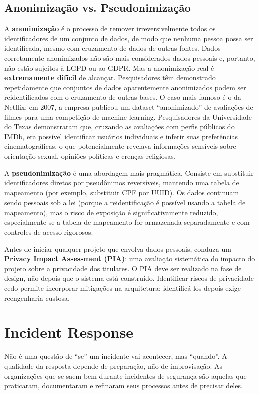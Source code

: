 \subsection{Anonimização vs. Pseudonimização}

A \textbf{anonimização} é o processo de remover irreversivelmente todos os
identificadores de um conjunto de dados, de modo que nenhuma pessoa possa ser
identificada, mesmo com cruzamento de dados de outras fontes. Dados
corretamente anonimizados não são mais considerados dados pessoais e, portanto,
não estão sujeitos à LGPD ou ao GDPR. Mas a anonimização real é
\textbf{extremamente difícil} de alcançar. Pesquisadores têm demonstrado
repetidamente que conjuntos de dados aparentemente anonimizados podem ser
reidentificados com o cruzamento de outras bases. O caso mais famoso é o da
Netflix: em 2007, a empresa publicou um dataset ``anonimizado'' de avaliações
de filmes para uma competição de machine learning. Pesquisadores da Universidade
do Texas demonstraram que, cruzando as avaliações com perfis públicos do IMDb,
era possível identificar usuários individuais e inferir suas preferências
cinematográficas, o que potencialmente revelava informações sensíveis sobre
orientação sexual, opiniões políticas e crenças religiosas.

A \textbf{pseudonimização} é uma abordagem mais pragmática. Consiste em
substituir identificadores diretos por pseudônimos reversíveis, mantendo uma
tabela de mapeamento (por exemplo, substituir CPF por UUID). Os dados continuam
sendo pessoais sob a lei (porque a reidentificação é possível usando a tabela de
mapeamento), mas o risco de exposição é significativamente reduzido, especialmente
se a tabela de mapeamento for armazenada separadamente e com controles de acesso
rigorosos.

Antes de iniciar qualquer projeto que envolva dados pessoais, conduza um
\textbf{Privacy Impact Assessment (PIA)}: uma avaliação sistemática do impacto
do projeto sobre a privacidade dos titulares. O PIA deve ser realizado na fase
de design, não depois que o sistema está construído. Identificar riscos de
privacidade cedo permite incorporar mitigações na arquitetura; identificá-los
depois exige reengenharia custosa.

\section{Incident Response}

Não é uma questão de ``se'' um incidente vai acontecer, mas ``quando''. A
qualidade da resposta depende de preparação, não de improvisação. As organizações
que se saem bem durante incidentes de segurança são aquelas que praticaram,
documentaram e refinaram seus processos antes de precisar deles.

